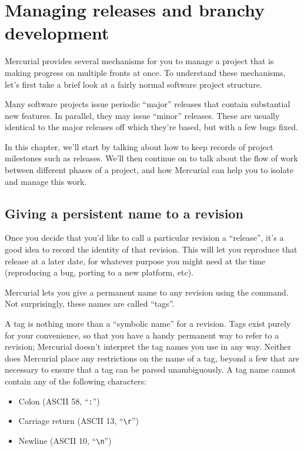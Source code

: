 \chapter{Managing releases and branchy development}
\label{chap:branch}

Mercurial provides several mechanisms for you to manage a project that
is making progress on multiple fronts at once.  To understand these
mechanisms, let's first take a brief look at a fairly normal software
project structure.

Many software projects issue periodic ``major'' releases that contain
substantial new features.  In parallel, they may issue ``minor''
releases.  These are usually identical to the major releases off which
they're based, but with a few bugs fixed.

In this chapter, we'll start by talking about how to keep records of
project milestones such as releases.  We'll then continue on to talk
about the flow of work between different phases of a project, and how
Mercurial can help you to isolate and manage this work.

\section{Giving a persistent name to a revision}

Once you decide that you'd like to call a particular revision a
``release'', it's a good idea to record the identity of that revision.
This will let you reproduce that release at a later date, for whatever
purpose you might need at the time (reproducing a bug, porting to a
new platform, etc).

Mercurial lets you give a permanent name to any revision using the
 command.  Not surprisingly, these names are called
``tags''.

A tag is nothing more than a ``symbolic name'' for a revision.  Tags
exist purely for your convenience, so that you have a handy permanent
way to refer to a revision; Mercurial doesn't interpret the tag names
you use in any way.  Neither does Mercurial place any restrictions on
the name of a tag, beyond a few that are necessary to ensure that a
tag can be parsed unambiguously.  A tag name cannot contain any of the
following characters:
\begin{itemize}
\item Colon (ASCII 58, ``\texttt{:}'')
\item Carriage return (ASCII 13, ``\Verb+\r+'')
\item Newline (ASCII 10, ``\Verb+\n+'')
\end{itemize}


